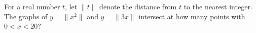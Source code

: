 For a real number \(t\), let \(\|t\|\) denote the distance from \(t\) to the nearest integer. The graphs of \(y=\|x^2\|\) and \(y=\|3x\|\) intersect at how many points with \(0<x<20\)?
